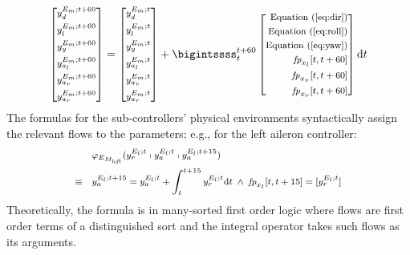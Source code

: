 \documentclass{sig-alternate}
\begin{document}
\[
\left[
\begin{medsize}
\begin{aligned}
y_d^{E_m;t+60}\\ 
y_l^{E_m;t+60}\\
y_y^{E_m;t+60}\\
y_{a_l}^{E_m;t+60}\\
y_{a_v}^{E_m;t+60}\\
y_{a_r}^{E_m;t+60}
\end{aligned}
\end{medsize}
\right]
=
\left[
\begin{medsize}
\begin{aligned}
y_d^{E_m;t}\\ 
y_l^{E_m;t}\\
y_y^{E_m;t}\\
y_{a_l}^{E_m;t}\\
y_{a_v}^{E_m;t}\\
y_{a_r}^{E_m;t}
\end{aligned}
\end{medsize}
\right]
+
\bigintssss_{t}^{t + 60}
\left[
\begin{medsize}
\begin{aligned}
\mathrm{Equation~(\ref{eq:dir})}
\\
\mathrm{Equation~(\ref{eq:roll})}
\\
\mathrm{Equation~(\ref{eq:yaw})}
 \\
\mathit{fp}_{x_l}{[t,t+60]}
\\
\mathit{fp}_{x_v}{[t,t+60]}
\\
\mathit{fp}_{x_r}{[t,t+60]}
\end{aligned}
\end{medsize}
\right]
\mathrm{d}t
\]
The formulas for the sub-controllers' physical environments
syntactically assign the relevant flows  to the parameters;
e.g., for the left aileron controller:
\[
\begin{medsize}
\begin{aligned}
&
\varphi_{E_{M_\mathit{left}}}(y_{r}^{E_l;t} \shortmid y_{a}^{E_l;t} \shortmid y_{a}^{E_l;t + 15})
\\ 
\equiv\quad&
y_{a}^{E_l;t + 15} = y_{a}^{E_l;t} + \int_{t}^{t+15} y_{r}^{E_l;t} \mathrm{d}t
\;\wedge\;
\mathit{fp}_{x_l}{[t,t+15]} = [y_{r}^{E_l;t}]
\end{aligned}
\end{medsize}
\]
Theoretically, 
the formula is in many-sorted first order logic
where flows are first order terms of a distinguished sort
and the integral operator takes such flows as its arguments.
\end{document}
